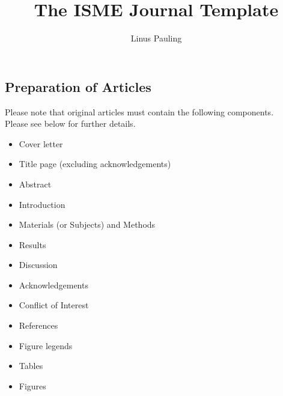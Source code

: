 \documentclass{article}
\providecommand{\tightlist}{\setlength{\itemsep}{0pt}\setlength{\parskip}{0pt}}%
\begin{document}
\title{The ISME Journal Template\\}


 \author{Linus Pauling}


\date{}

\begingroup
\let\center\flushleft
\let\endcenter\endflushleft
\maketitle
\endgroup




\subsection*{Preparation of Articles}\label{auto-label-subsection-804801}

Please note that original articles must contain the following
components.\\

Please see below for further details.\\

\begin{itemize}
\tightlist
\item
  Cover letter\\
\item
  Title page (excluding acknowledgements)\\
\item
  Abstract\\
\item
  Introduction\\
\item
  Materials (or Subjects) and Methods\\
\item
  Results\\
\item
  Discussion\\
\item
  Acknowledgements\\
\item
  Conflict of Interest\\
\item
  References\\
\item
  Figure legends\\
\item
  Tables\\
\item
  Figures\\
\end{itemize}
\end{document}
